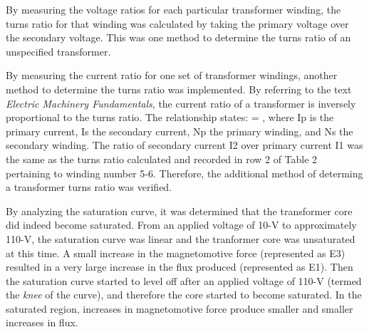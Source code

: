 \documentclass{article}
\begin{document}
By measuring the voltage ratios for each particular transformer winding, the turns ratio for that winding
was calculated by taking the primary voltage over the secondary voltage. This was one method to determine
the turns ratio of an unspecified transformer. 

By measuring the current ratio for one set of transformer windings, another method to determine the turns ratio
was implemented. By referring to the text \emph{Electric Machinery Fundamentals}, the current ratio of a 
transformer is inversely proportional to the turns ratio. The relationship states:  = , 
where Ip is the primary current, Is the secondary current, Np the primary winding, and Ns the secondary winding. 
The ratio of secondary current I2 over primary current I1 was the same as the turns ratio calculated and recorded 
in row 2 of Table 2 pertaining to winding number 5-6. Therefore, the additional method of determing a transformer 
turns ratio was verified.

By analyzing the saturation curve, it was determined that the transformer core did indeed become saturated.
From an applied voltage of 10-V to approximately 110-V, the saturation curve was linear and the tranformer
core was unsaturated at this time. A small increase in the magnetomotive force (represented as E3) resulted in 
a very large increase in the flux produced (represented as E1). Then the saturation curve started to level off 
after an applied voltage of 110-V (termed the \emph{knee} of the curve), and therefore the core started to 
become saturated. In the saturated region, increases in magnetomotive force produce smaller and smaller increases 
in flux.
\end{document}
